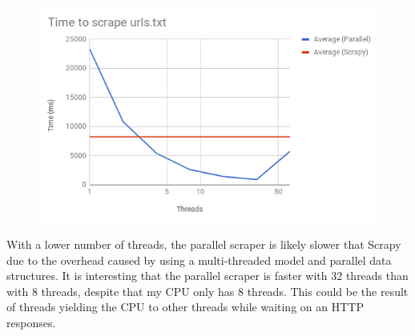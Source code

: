 \documentclass[11pt]{article}
\begin{document}
\begin{figure}[H]
	\centering
	\includegraphics[scale=0.5]{graph_log}
\end{figure}

With a lower number of threads, the parallel scraper is likely slower that Scrapy due to the overhead caused by using a multi-threaded model and parallel data structures. It is interesting that the parallel scraper is faster with 32 threads than with 8 threads, despite that my CPU only has 8 threads. This could be the result of threads yielding the CPU to other threads while waiting on an HTTP responses.
\end{document}
